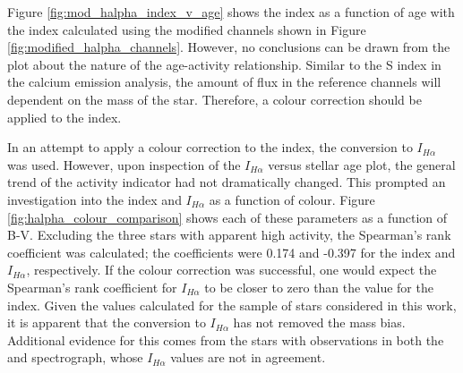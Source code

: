 Figure \ref{fig:mod_halpha_index_v_age} shows the \Halpha index as a function of age with the \Halpha index calculated using the modified channels shown in Figure \ref{fig:modified_halpha_channels}. However, no conclusions can be drawn from the plot about the nature of the age-activity relationship. Similar to the S index in the calcium emission analysis, the amount of flux in the reference channels will dependent on the mass of the star. Therefore, a colour correction should be applied to the \Halpha index.

In an attempt to apply a colour correction to the \Halpha index, the conversion to $I_{H\alpha}$ \citep{Gomes_da_Silva_etal_2014} was used. However, upon inspection of the $I_{H\alpha}$ versus stellar age plot, the general trend of the activity indicator had not dramatically changed. This prompted an investigation into the \Halpha index and $I_{H\alpha}$ as a function of colour. Figure \ref{fig:halpha_colour_comparison} shows each of these parameters as a function of B-V. Excluding the three stars with apparent high \Halpha activity, the Spearman's rank coefficient was calculated; the coefficients were 0.174 and -0.397 for the \Halpha index and $I_{H\alpha}$, respectively. If the colour correction was successful, one would expect the Spearman's rank coefficient for $I_{H\alpha}$ to be closer to zero than the value for the \Halpha index. Given the values calculated for the sample of stars considered in this work, it is apparent that the conversion to $I_{H\alpha}$ has not removed the mass bias. Additional evidence for this comes from the stars with observations in both the \esp and \narval spectrograph, whose $I_{H\alpha}$ values are not in agreement.

